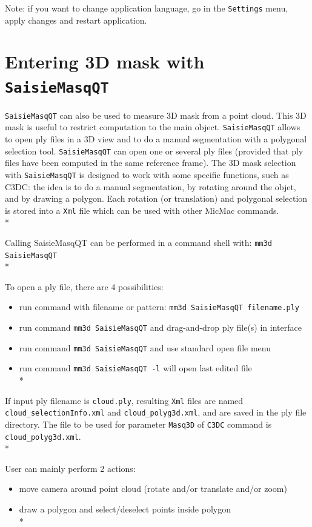 Note: if you want to change application language, go in the {\tt Settings} menu, apply changes and restart application.

\section{Entering 3D mask with {\tt SaisieMasqQT} }

{\tt SaisieMasqQT} can also be used to measure 3D mask from a point cloud. This 3D mask is useful to restrict computation to the main object.
{\tt SaisieMasqQT} allows to open ply files in a 3D view and to do a manual segmentation with a polygonal selection tool.
{\tt SaisieMasqQT} can open one or several ply files (provided that ply files have been computed in the same reference frame).
The 3D mask selection with {\tt SaisieMasqQT} is designed to work with some specific functions, such as C3DC: the idea is to do a manual segmentation,
by rotating around the objet, and by drawing a polygon.
Each rotation (or translation) and polygonal selection is stored into a {\tt Xml} file which can be used with other MicMac commands.\\*

Calling SaisieMasqQT can be performed in a command shell with: {\tt mm3d SaisieMasqQT}\\*

To open a ply file, there are 4 possibilities:
\begin{itemize}
\item run command with filename or pattern: {\tt mm3d SaisieMasqQT filename.ply}
\item run command {\tt mm3d SaisieMasqQT} and drag-and-drop ply file(s) in interface
\item run command {\tt mm3d SaisieMasqQT} and use standard open file menu
\item run command {\tt mm3d SaisieMasqQT -l} will open last edited file\\*
\end{itemize}

If input ply filename is {\tt cloud.ply}, resulting {\tt Xml} files are named {\tt cloud\_selectionInfo.xml} and {\tt cloud\_polyg3d.xml}, and are saved in the ply file directory.
The file to be used for parameter {\tt Masq3D} of {\tt C3DC} command is {\tt cloud\_polyg3d.xml}.\\*

User can mainly perform 2 actions:
\begin{itemize}
\item move camera around point cloud (rotate and/or translate and/or zoom)
\item draw a polygon and select/deselect points inside polygon\\*
\end{itemize}

